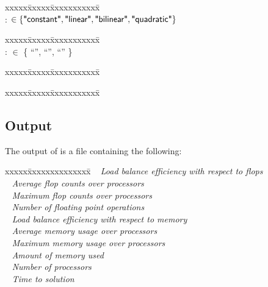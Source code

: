 \documentclass[10pt]{article}
\begin{document}
\begin{tabbing}
xxxxx\=xxxxx\=xxxxxxxxxxx\=\kill
\> \todo\   \\
\> \> :     \>  $\in \{\textsf{"constant"},\textsf{"linear"},\textsf{"bilinear"},\textsf{"quadratic"}\}$
\end{tabbing}
\begin{tabbing}
xxxxx\=xxxxx\=xxxxxxxxxxx\=\kill
\> \done\    \\
\> \> :     \>  $\in$ \{ ``'', ``'', ``'' \}
\end{tabbing}
\begin{tabbing}
xxxxx\=xxxxx\=xxxxxxxxxxx\=\kill
\> \done\   
\end{tabbing}
\begin{tabbing}
xxxxx\=xxxxx\=xxxxxxxxxxx\=\kill
\> \done\   
\end{tabbing}


\subsection{Output}

The output of  is a file containing the following:

\begin{tabbing}
xxxxx\=xxxxxxxxxxxxxx\=\kill
\> \todo\  \>    \textit{Load balance efficiency with respect to flops}\\
\> \todo\  \> \textit{Average flop counts over processors} \\
\> \todo\  \> \textit{Maximum flop counts over processors} \\
\> \todo\  \> \textit{Number of floating point operations} \\
\> \todo\  \>    \textit{Load balance efficiency with respect to memory}\\
\> \todo\  \> \textit{Average memory usage over processors} \\
\> \todo\  \>    \textit{Maximum memory usage over processors} \\
\> \todo\  \> \textit{Amount of memory used} \\
\> \todo\  \> \textit{Number of processors} \\
\> \todo\  \>  \textit{Time to solution}
\end{tabbing}
\end{document}
